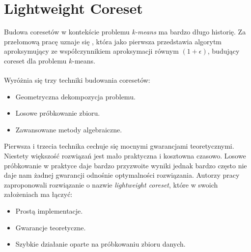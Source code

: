 \chapter{Lightweight Coreset}

Budowa coresetów w kontekście problemu \textit{k-means} ma bardzo długo historię.
Za przełomową pracę uznaje się \cite{Matousek99onapproximate}, która jako pierwsza przedstawia algorytm aproksymujący ze współczynnikiem aproksymacji równym $(1+\epsilon)$, budujący coreset dla problemu $k$-means.
\\~\\
Wyróżnia się trzy techniki budowania coresetów:
\begin{itemize}
    \item Geometryczna dekompozycja problemu.
    \item Losowe próbkowanie zbioru.
    \item Zawansowane metody algebraiczne.
\end{itemize}
Pierwsza i trzecia technika cechuje się mocnymi gwarancjami teoretycznymi.
Niestety większość rozwiązań jest mało praktyczna i kosztowna czasowo.
Losowe próbkowanie w praktyce daje bardzo przyzwoite wyniki jednak bardzo często nie daje nam żadnej gwarancji odnośnie optymalności rozwiązania.
Autorzy pracy \cite{bachem2017scalable} zaproponowali rozwiązanie o nazwie \textit{lightweight coreset}, które w swoich założeniach ma łączyć:
\begin{itemize}
    \item Prostą implementacje.
    \item Gwarancje teoretyczne.
    \item Szybkie działanie oparte na próbkowaniu zbioru danych.
\end{itemize}


